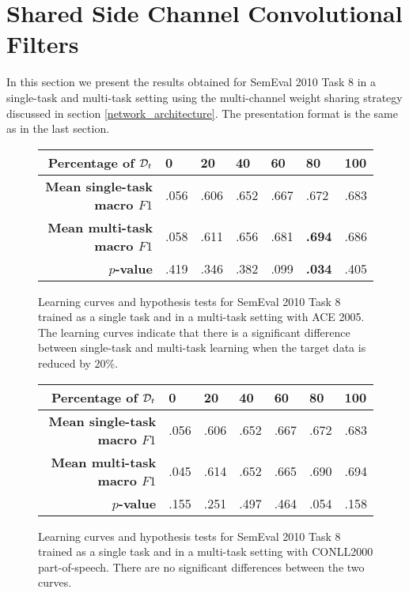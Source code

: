 \section{Shared Side Channel Convolutional Filters}
In this section we present the results obtained for SemEval 2010 Task 8 in a single-task and multi-task setting using the multi-channel weight sharing strategy discussed in section \ref{network_architecture}. The presentation format is the same as in the last section.
\vspace{1.6cm}
\begin{figure}[h]
	\centering
	
	
	\vspace*{1cm}
	
	\begin{tabular}{r | l | l | l | l | l | l}
		\textbf{Percentage of $\mathcal{D}_t$} & 0 & 20 & 40 & 60 & 80 & 100 \\  \hline
		\textbf{Mean single-task macro $F1$} & .056 & .606 & .652 & .667 & .672 & .683\\
		\textbf{Mean multi-task macro $F1$} & .058 & .611 & .656 & .681 & \textbf{.694} & .686\\
		$p$\textbf{-value} & .419 & .346 & .382 & .099 & \textbf{.034} & .405
	\end{tabular}
	\caption{Learning curves and hypothesis tests for SemEval 2010 Task 8 trained as a single task and in a multi-task setting with ACE 2005. The learning curves indicate that there is a significant difference between single-task and multi-task learning when the target data is reduced by 20\%.}
\end{figure}
\begin{figure}
	\centering
	
	\vspace*{1cm}
	
	\begin{tabular}{r | l | l | l | l | l | l}
		\textbf{Percentage of $\mathcal{D}_t$} & 0 & 20 & 40 & 60 & 80 & 100 \\  \hline
		\textbf{Mean single-task macro $F1$} & .056 & .606 & .652 & .667 & .672 & .683\\
		\textbf{Mean multi-task macro $F1$} & .045 & .614 & .652 & .665 & .690 & .694\\
		$p$\textbf{-value} & .155 & .251 & .497 & .464 & .054 & .158
	\end{tabular}
	\caption{Learning curves and hypothesis tests for SemEval 2010 Task 8 trained as a single task and in a multi-task setting with CONLL2000 part-of-speech. There are no significant differences between the two curves.}
\end{figure}
